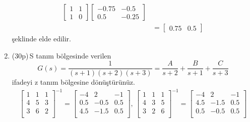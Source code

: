 \begin{enumerate}[\bfseries S1.]
\begin{equation}
\begin{split}
\begin{bmatrix}
                1&     1\\
                1&     0
            \end{bmatrix}\begin{bmatrix}
                -0.75&   -0.5\\
                0.5&   -0.25
            \end{bmatrix}\\
            &=\begin{bmatrix}0.75& 0.5\end{bmatrix}
        \end{split}
    \end{equation}
    şeklinde elde edilir.

    \item (30p)\,S tanım bölgesinde verilen 
    \begin{equation}
        G(s)=\frac{1}{(s+1)(s+2)(s+3)}=\frac{A}{s+2}+\frac{B}{s+1}+\frac{C}{s+3}
    \end{equation}
    ifadeyi z tanım bölgesine dönüştürünüz. 
    \begin{equation*}
        \begin{split}
            \begin{bmatrix}
                1&     1&     1\\
                4&     5&     3\\
                3&     6&     2\\
            \end{bmatrix}^{-1}=\begin{bmatrix}
                -4 &   2   &    -1\\
                0.5&   -0.5&    0.5\\
                4.5&   -1.5&    0.5\\
            \end{bmatrix},\,
            \begin{bmatrix}
                1&     1&     1\\
                4&     3&     5\\
                3&     2&     6\\
            \end{bmatrix}^{-1}=\begin{bmatrix}
                -4&    2&   -1\\
                4.5&   -1.5&    0.5\\
                0.5&  -0.5&    0.5\\
            \end{bmatrix}\\

\end{split}
\end{equation*}
\end{enumerate}
